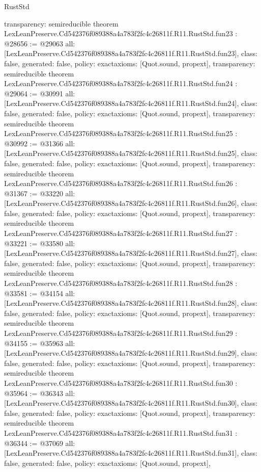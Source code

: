 \begin{lexlean}{RustStd}
\begin{coremodule}
{  transparency: semireducible
}
theorem LexLeanPreserve.Cd542376f089388a4a783f2fc4c26811f.R11.RustStd.fun23 : @28656 := @29063 {
  all: [LexLeanPreserve.Cd542376f089388a4a783f2fc4c26811f.R11.RustStd.fun23],
  class: false,
  generated: false,
  policy: exact{axioms: [Quot.sound, propext]},
  transparency: semireducible
}
theorem LexLeanPreserve.Cd542376f089388a4a783f2fc4c26811f.R11.RustStd.fun24 : @29064 := @30991 {
  all: [LexLeanPreserve.Cd542376f089388a4a783f2fc4c26811f.R11.RustStd.fun24],
  class: false,
  generated: false,
  policy: exact{axioms: [Quot.sound, propext]},
  transparency: semireducible
}
theorem LexLeanPreserve.Cd542376f089388a4a783f2fc4c26811f.R11.RustStd.fun25 : @30992 := @31366 {
  all: [LexLeanPreserve.Cd542376f089388a4a783f2fc4c26811f.R11.RustStd.fun25],
  class: false,
  generated: false,
  policy: exact{axioms: [Quot.sound, propext]},
  transparency: semireducible
}
theorem LexLeanPreserve.Cd542376f089388a4a783f2fc4c26811f.R11.RustStd.fun26 : @31367 := @33220 {
  all: [LexLeanPreserve.Cd542376f089388a4a783f2fc4c26811f.R11.RustStd.fun26],
  class: false,
  generated: false,
  policy: exact{axioms: [Quot.sound, propext]},
  transparency: semireducible
}
theorem LexLeanPreserve.Cd542376f089388a4a783f2fc4c26811f.R11.RustStd.fun27 : @33221 := @33580 {
  all: [LexLeanPreserve.Cd542376f089388a4a783f2fc4c26811f.R11.RustStd.fun27],
  class: false,
  generated: false,
  policy: exact{axioms: [Quot.sound, propext]},
  transparency: semireducible
}
theorem LexLeanPreserve.Cd542376f089388a4a783f2fc4c26811f.R11.RustStd.fun28 : @33581 := @34154 {
  all: [LexLeanPreserve.Cd542376f089388a4a783f2fc4c26811f.R11.RustStd.fun28],
  class: false,
  generated: false,
  policy: exact{axioms: [Quot.sound, propext]},
  transparency: semireducible
}
theorem LexLeanPreserve.Cd542376f089388a4a783f2fc4c26811f.R11.RustStd.fun29 : @34155 := @35963 {
  all: [LexLeanPreserve.Cd542376f089388a4a783f2fc4c26811f.R11.RustStd.fun29],
  class: false,
  generated: false,
  policy: exact{axioms: [Quot.sound, propext]},
  transparency: semireducible
}
theorem LexLeanPreserve.Cd542376f089388a4a783f2fc4c26811f.R11.RustStd.fun30 : @35964 := @36343 {
  all: [LexLeanPreserve.Cd542376f089388a4a783f2fc4c26811f.R11.RustStd.fun30],
  class: false,
  generated: false,
  policy: exact{axioms: [Quot.sound, propext]},
  transparency: semireducible
}
theorem LexLeanPreserve.Cd542376f089388a4a783f2fc4c26811f.R11.RustStd.fun31 : @36344 := @37069 {
  all: [LexLeanPreserve.Cd542376f089388a4a783f2fc4c26811f.R11.RustStd.fun31],
  class: false,
  generated: false,
  policy: exact{axioms: [Quot.sound, propext]},
}
\end{coremodule}
\end{lexlean}
